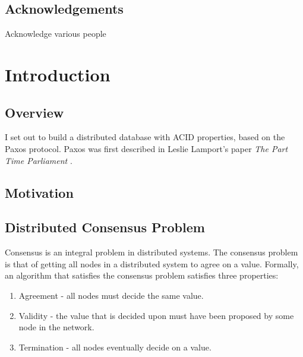 \documentclass[12pt,twoside,notitlepage]{report}
\begin{document}
\tableofcontents

\listoffigures

\newpage
\section*{Acknowledgements}

Acknowledge various people


\cleardoublepage        %

\setcounter{page}{1}
\pagestyle{headings}

\chapter{Introduction}

\section{Overview}


I set out to build a distributed database with ACID properties, based on the Paxos protocol. Paxos
was first described in Leslie Lamport's paper \emph{The Part Time Parliament} \cite{lamport98}.

\section{Motivation}


\section{Distributed Consensus Problem}

Consensus is an integral problem in distributed systems. The consensus problem is that of getting
all nodes in a distributed system to agree on a value. Formally, an algorithm that satisfies the
consensus problem satisfies three properties:

\begin{enumerate}
\item Agreement - all nodes must decide the same value.
\item Validity - the value that is decided upon must have been proposed by some node in the
	network.
\item Termination - all nodes eventually decide on a value.
\end{enumerate}
\end{document}
